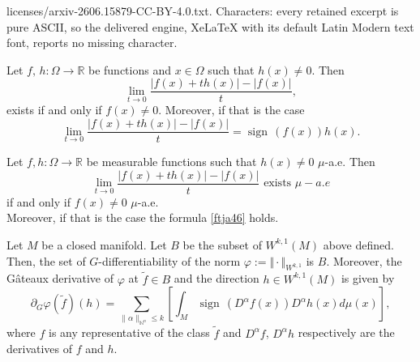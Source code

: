 \documentclass[10pt,a4paper]{amsart}
\DeclareMathOperator*{\sign}{sign\,}
\newcommand{\ar}{\mathbb{R}}
\newcommand{\beq}{\begin{equation}}
\newcommand{\eq}{\end{equation}}
\begin{document}
licenses/arxiv-2606.15879-CC-BY-4.0.txt. Characters: every retained excerpt is pure ASCII, so the delivered engine, XeLaTeX with its default Latin Modern text font, reports no missing character.
\begin{lemma}\label{lmain1a} Let $f,\, h:\Omega\rightarrow \ar$  be functions and $x\in\Omega$ such that $h(x)\neq 0$. Then 
\beq\lim\limits_{t\rightarrow 0}\frac{|f(x)+th(x)|-|f(x)|}{t},\label{j6nr}\eq
exists if and only if $f(x)\neq 0$. Moreover, if that is the case
\beq\lim\limits_{t\rightarrow 0}\frac{|f(x)+th(x)|-|f(x)|}{t}=\sign(f(x))h(x).\label{ftja46}\eq
\end{lemma}

\begin{corollary} \label{cordd2} Let $f, h:\Omega\rightarrow \ar$ be measurable functions such that $h(x)\neq 0$ $\mu$-a.e. Then 
\beq\lim\limits_{t\rightarrow 0}\frac{|f(x)+th(x)|-|f(x)|}{t} \mbox{ exists } \mu-a.e\label{limj57}\eq
if and only if $f(x)\neq 0$ $\mu$-a.e.\\

Moreover, if that is the case the formula \eqref{ftja46} holds.
\end{corollary}

\begin{theorem}\label{main1a} Let $M$ be a closed manifold. Let $B$ be the subset of $W^{k,1}(M)$ above defined. Then, the set of $G$-differentiability of the norm $\varphi:=\Vert\cdot\Vert_{W^{k,1}}$ is $B$. Moreover, the G\^ateaux derivative of  $\varphi$ at  $\tilde{f}\in B$ and the direction $h\in W^{k,1}(M)$ is given by 
	\beq\partial_{G}\varphi(\tilde{f})(h)=\sum_{\|\alpha\|_{\mathbb{N}^{n}}\leq k}\left[ \int_{M  } \sign(D^{\alpha}f(x))D^{\alpha}h(x)d\mu(x)\right] ,\label{Gder67}\eq
where $f$ is any representative of the class  $\tilde{f}$ and $D^{\alpha}f$, $D^{\alpha}h$ respectively are the derivatives of $f$ and $h$. 
	\end{theorem}
\end{document}
